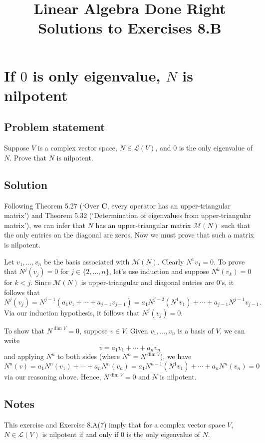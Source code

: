 \documentclass{article}
\title{Linear Algebra Done Right\\Solutions to Exercises 8.B}
\author{}
\date{}
\begin{document}
\maketitle

\section{If $0$ is only eigenvalue, $N$ is nilpotent}
\subsection*{Problem statement}
Suppose $V$ is a complex vector space, $N\in\mathcal{L}(V)$, and $0$ is the only eigenvalue of $N$. 
Prove that $N$ is nilpotent.

\subsection*{Solution}
Following Theorem 5.27 (`Over $\mathbf{C}$, every operator has an upper-triangular matrix') and Theorem 5.32 (`Determination of eigenvalues from upper-triangular matrix'), we can infer that $N$ has an upper-triangular matrix $\mathcal{M}(N)$ such that the only entries on the diagonal are zeros. 
Now we must prove that such a matrix is nilpotent.

Let $v_1,\ldots,v_n$ be the basis associated with $\mathcal{M}(N)$. 
Clearly $N^1v_1=0$. 
To prove that $N^j(v_j)=0$ for $j\in\{2,\ldots,n\}$, let's use induction and suppose $N^k(v_k)=0$ for $k<j$. 
Since $\mathcal{M}(N)$ is upper-triangular and diagonal entries are $0$'s, it follows that 
\[N^j(v_j)=N^{j-1}(a_1v_1+\cdots+a_{j-1}v_{j-1})=a_1N^{j-2}(N^1v_1)+\cdots+a_{j-1}N^{j-1}v_{j-1}.\]
Via our induction hypothesis, it follows that $N^j(v_j)=0$.

To show that $N^{\operatorname{dim}V}=0$, suppose $v\in V$. 
Given $v_1,\ldots,v_n$ is a basis of $V$, we can write
\[v=a_1v_1+\cdots+a_nv_n\]
and applying $N^n$ to both sides (where $N^n=N^{\operatorname{dim}V}$), we have
\[N^n(v)=a_1N^n(v_1)+\cdots+a_nN^n(v_n)=a_1N^{n-1}(N^1v_1)+\cdots+a_nN^n(v_n)=0\]
via our reasoning above. 
Hence, $N^{\operatorname{dim}V}=0$ and $N$ is nilpotent.

\subsection*{Notes}
This exercise and Exercise 8.A(7) imply that for a complex vector space $V$, $N\in\mathcal{L}(V)$ is nilpotent if and only if $0$ is the only eigenvalue of $N$.
\end{document}
